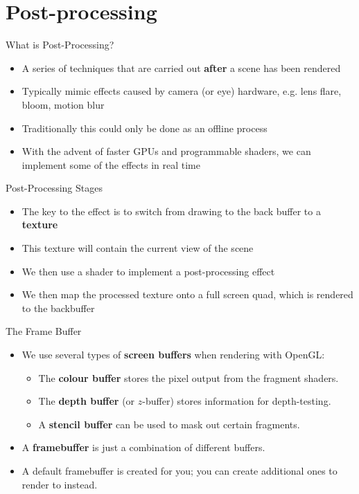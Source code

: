 \part{Post-processing}
\frame{\partpage}

\begin{frame}{What is Post-Processing?}
	\begin{itemize}
		\pause\item A series of techniques that are carried out \textbf{after} a scene has been rendered
		\pause\item Typically mimic effects caused by camera (or eye) hardware, e.g. lens flare, bloom, motion blur
		\pause\item Traditionally this could only be done as an offline process
		\pause\item With the advent of faster GPUs and programmable shaders, we can implement some of the effects in real time
	\end{itemize}
\end{frame}

\begin{frame}{Post-Processing Stages}
	\begin{itemize}
		\pause\item The key to the effect is to switch from drawing to the back buffer to a \textbf{texture}
		\pause\item This texture will contain the current view of the scene
		\pause\item We then use a shader to implement a post-processing effect
		\pause\item We then map the processed texture onto a full screen quad, which is rendered to the backbuffer
	\end{itemize}
\end{frame}

\begin{frame}{The Frame Buffer}
	\begin{itemize}
		\pause\item We use several types of \textbf{screen buffers} when rendering with OpenGL:
		\begin{itemize}
			\pause\item The \textbf{colour buffer} stores the pixel output from the fragment shaders.
			\pause\item The \textbf{depth buffer} (or $z$-buffer) stores information for depth-testing.
			\pause\item A \textbf{stencil buffer} can be used to mask out certain fragments.
		\end{itemize}
		\pause\item A \textbf{framebuffer} is just a combination of different buffers.
		\pause\item A default framebuffer is created for you; you can create additional ones to render to instead.
	\end{itemize}
\end{frame}